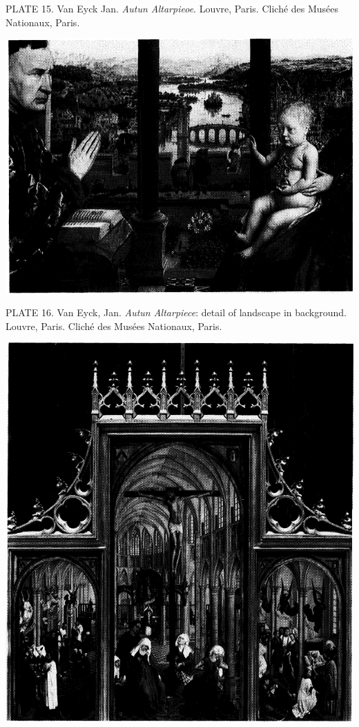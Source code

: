 PLATE 15. Van Eyck Jan. \emph{Autun Altarpieoe}. Louvre, Paris. Cliché
des Musées Nationaux, Paris.

\protect\hypertarget{20_ILLUSTRATIONS_FOLLOW_PAGE.xhtmlux5cux23id_16}{}{}\includegraphics{include/html/images/336_1.png}

PLATE 16. Van Eyck, Jan. \emph{Autun Altarpiece}: detail of landscape in
background. Louvre, Paris. Cliché des Musées Nationaux, Paris.

\protect\hypertarget{20_ILLUSTRATIONS_FOLLOW_PAGE.xhtmlux5cux23id_17}{}{}\includegraphics{include/html/images/337_1.png}

